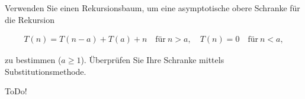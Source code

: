 
\begin{exercise}

Verwenden Sie einen Rekursionsbaum, um eine asymptotische obere Schranke für die Rekursion

\begin{align*}
  T(n) = T(n-a) + T(a) + n \quad \text{für}~ n > a,\quad T(n) = 0 \quad \text{für}~ n < a,
\end{align*}

zu bestimmen ($a \geq 1$). Überprüfen Sie Ihre Schranke mittels Substitutionsmethode.
\end{exercise}


\begin{solution}

ToDo!

\end{solution}

